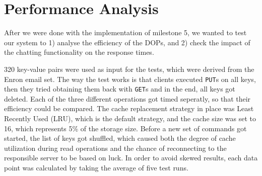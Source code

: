 \section{Performance Analysis}
\label{sec:perf}

After we were done with the implementation of milestone 5, we wanted to test our system to 1) analyse the efficiency of the DOPs, and 2) check the impact of the chatting functionality on the response times.

320 key-value pairs were used as input for the tests, which were derived from the Enron email set. The way the test works is that clients executed \texttt{PUT}s on all keys, then they tried obtaining them back with \texttt{GET}s and in the end, all keys got deleted. Each of the three different operations got timed seperatly, so that their efficiency could be compared. The cache replacement strategy in place was Least Recently Used (LRU), which is the default strategy, and the cache size was set to 16, which represents 5\% of the storage size. Before a new set of commands got started, the list of keys got shuffled, which caused both the degree of cache utilization during read operations and the chance of reconnecting to the responsible server to be based on luck.
In order to avoid skewed results, each data point was calculated by taking the average of five test runs.

